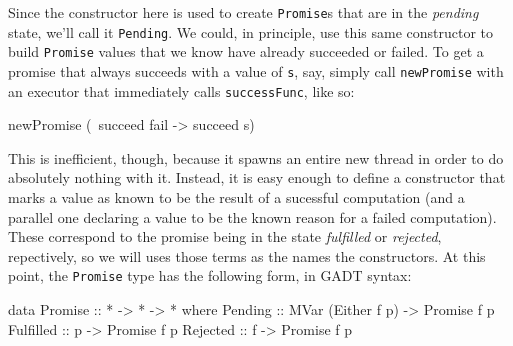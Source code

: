 \documentclass[12pt, english, letterpaper]{kuthesis}
\newcommand{\lit}[1]{\texttt{#1}}
\begin{document}
Since the constructor here is used to create \lit{Promise}s that are in the \emph{pending} state, we'll call it \lit{Pending}.  We could, in principle, use this same constructor to build \lit{Promise} values that we know have already succeeded or failed.  To get a promise that always succeeds with a value of \lit s, say, simply call \lit{newPromise} with an executor that immediately calls \lit{successFunc}, like so:
\begin{code}
newPromise (\ succeed fail -> succeed s)
\end{code}
This is inefficient, though, because it spawns an entire new thread in order to do absolutely nothing with it.  Instead, it is easy enough to define a constructor that marks a value as known to be the result of a sucessful computation (and a parallel one declaring a value to be the known reason for a failed computation).  These correspond to the promise being in the state \emph{fulfilled} or \emph{rejected}, repectively, so we will uses those terms as the names the constructors.  At this point, the \lit{Promise} type has the following form, in GADT syntax:
\begin{code}
data Promise :: * -> * -> * where
  Pending :: MVar (Either f p) -> Promise f p
  Fulfilled :: p -> Promise f p
  Rejected :: f -> Promise f p
\end{code}
\end{document}
